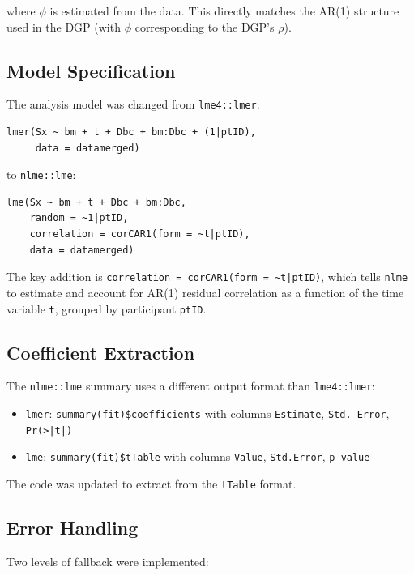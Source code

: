 \documentclass[11pt]{article}
\begin{document}
where $\phi$ is estimated from the data. This directly matches
the AR(1) structure used in the DGP (with $\phi$ corresponding
to the DGP's $\rho$).

\subsection{Model Specification}

The analysis model was changed from \texttt{lme4::lmer}:

\begin{verbatim}
lmer(Sx ~ bm + t + Dbc + bm:Dbc + (1|ptID),
     data = datamerged)
\end{verbatim}

to \texttt{nlme::lme}:

\begin{verbatim}
lme(Sx ~ bm + t + Dbc + bm:Dbc,
    random = ~1|ptID,
    correlation = corCAR1(form = ~t|ptID),
    data = datamerged)
\end{verbatim}

The key addition is
\texttt{correlation = corCAR1(form = \textasciitilde t|ptID)},
which tells \texttt{nlme} to estimate and account for AR(1)
residual correlation as a function of the time variable
\texttt{t}, grouped by participant \texttt{ptID}.

\subsection{Coefficient Extraction}

The \texttt{nlme::lme} summary uses a different output
format than \texttt{lme4::lmer}:

\begin{itemize}
\item \texttt{lmer}: \texttt{summary(fit)\$coefficients}
  with columns \texttt{Estimate}, \texttt{Std. Error},
  \texttt{Pr(>|t|)}
\item \texttt{lme}: \texttt{summary(fit)\$tTable} with
  columns \texttt{Value}, \texttt{Std.Error},
  \texttt{p-value}
\end{itemize}

The code was updated to extract from the \texttt{tTable}
format.

\subsection{Error Handling}

Two levels of fallback were implemented:
\end{document}
